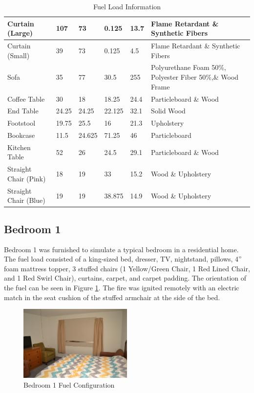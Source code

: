 \documentclass[12pt,oneside]{book}
\begin{document}
\begin{table}[H]
\begin{tabular}{|L{0.23\textwidth}|C{0.08\textwidth}|C{0.08\textwidth}|C{0.08\textwidth}|C{0.08\textwidth}|L{0.37\textwidth}|}
Curtain (Large) 			&107 			&73 			&0.125 			&13.7 			&Flame Retardant \& Synthetic Fibers \\ \hline
Curtain (Small) 			&39 			&73 			&0.125 			&4.5 			&Flame Retardant \& Synthetic Fibers \\ \hline
Sofa 						&35 			&77 			&30.5 			&255 			&Polyurethane Foam 50\%, Polyester Fiber 50\%,\& Wood Frame \\ \hline
Coffee Table 			 	&30 			&18 			&18.25 			&24.4 			&Particleboard \& Wood \\ \hline
End Table 			 		&24.25 			&24.25 			&22.125 		&32.1 			&Solid Wood \\ \hline
Footstool 					&19.75 			&25.5 			&16 			&21.3 			&Upholstery \\ \hline
Bookcase 					&11.5 			&24.625 		&71.25 			&46 			&Particleboard \\ \hline
Kitchen Table 				&52 			&26 			&24.5 			&29.1 			&Particleboard \& Wood \\ \hline
Straight Chair (Pink) 		&18 			&19 			&33 			&15.2 			&Wood \& Upholstery \\ \hline
Straight Chair (Blue) 		&19 			&19 			&38.875 		&14.9 			&Wood \& Upholstery \\ \hline
\end{tabular}
\caption{Fuel Load Information}
\label{table:fuel_weights}
\end{table}

\subsection*{Bedroom 1}
Bedroom 1 was furnished to simulate a typical bedroom in a residential home. The fuel load consisted of a king-sized bed, dresser, TV, nightstand, pillows, 4'' foam mattress topper, 3 stuffed chairs (1 Yellow/Green Chair, 1 Red Lined Chair, and 1 Red Swirl Chair), curtains, carpet, and carpet padding.  The orientation of the fuel can be seen in Figure \ref{figure:Bed1_fuel}. The fire was ignited remotely with an electric match in the seat cushion of the stuffed armchair at the side of the bed.

\begin{figure}[H]
\centering
\includegraphics[width=0.50\textwidth]{0_Images/Ranch_Pictures/Exp_3_Fuel.jpg}
\caption{Bedroom 1 Fuel Configuration}
\label{figure:Bed1_fuel}
\end{figure}
\end{document}
